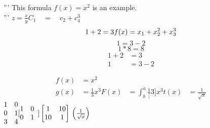 \documentclass{article}
\begin{document}
  \section{}
  '''
  This formula $f(x) = x^2$ is an example.\\
  '''
  $z = \frac{x}{y}$\quad $C_1 \quad = \quad c_2 + c_4^3$\\
  \begin{equation*}
      1 + 2 = 3\\
      f(x) = x_1 + x_2^2 + x_3^3
  \end{equation*}
  \begin{equation*}
      1 = 3 - 2
  \end{equation*}
  \begin{equation*}
      1 * 8 = 8
  \end{equation*}
  \begin{align*}
      1 + 2 &= 3\\
      1 &= 3-2
  \end{align*}

  \begin{align*}
      f(x) &= x^2\\
      g(x) &= \frac{1}{3}x^3
      F(x) &= \int^a_b \frac{1}[3]x^3
      t(x) &= \frac{1}{\sqrt{x}}
  \end{align*}
  $\begin{matrix}
      1 & 0\\
      0 & 1\\
      3 & 4
  \end{matrix}
  [
      \begin{matrix}
          1 & 0\\
          0 & 1
      \end{matrix}\\
  ]
  \left[
      \begin{matrix}
          1 & 10\\
          10 & 1
      \end{matrix}
  \right]\\
  \left(\frac{1}{\sqrt{x}}\right)
$
\end{document}
